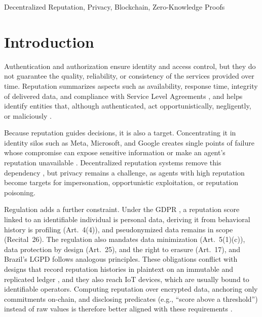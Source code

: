 \documentclass[conference]{IEEEtran}
\begin{document}
\begin{IEEEkeywords}
Decentralized Reputation, Privacy, Blockchain, Zero-Knowledge Proofs
\end{IEEEkeywords}

\section{Introduction}
Authentication and authorization ensure identity and access control, but they do not guarantee the quality, reliability, or consistency of the services provided over time. Reputation summarizes aspects such as availability, response time, integrity of delivered data, and compliance with Service Level Agreements \cite{fernandes2023blockchain, liu2022vrepchain, 10335003}, and helps identify entities that, although authenticated, act opportunistically, negligently, or maliciously \cite{ZHOU2021155, arshad2022reputable, solomon2023smartfhe}.

Because reputation guides decisions, it is also a target. Concentrating it in identity silos such as Meta, Microsoft, and Google creates single points of failure whose compromise can expose sensitive information or make an agent's reputation unavailable \cite{10891701, ernstberger2023sok, ZHOU2021155, lu2023towards}. Decentralized reputation systems remove this dependency \cite{arshad2022reputable}, but privacy remains a challenge, as agents with high reputation become targets for impersonation, opportunistic exploitation, or reputation poisoning.

Regulation adds a further constraint. Under the GDPR \cite{gdpr2016}, a reputation score linked to an identifiable individual is personal data, deriving it from behavioral history is profiling (Art.~4(4)), and pseudonymized data remains in scope (Recital~26). The regulation also mandates data minimization (Art.~5(1)(c)), data protection by design (Art.~25), and the right to erasure (Art.~17), and Brazil's LGPD \cite{lgpd2018} follows analogous principles. These obligations conflict with designs that record reputation histories in plaintext on an immutable and replicated ledger \cite{finck2019blockchain}, and they also reach IoT devices, which are usually bound to identifiable operators. Computing reputation over encrypted data, anchoring only commitments on-chain, and disclosing predicates (e.g., ``score above a threshold'') instead of raw values is therefore better aligned with these requirements \cite{aronoff2025sok, R2026377}.
\end{document}
